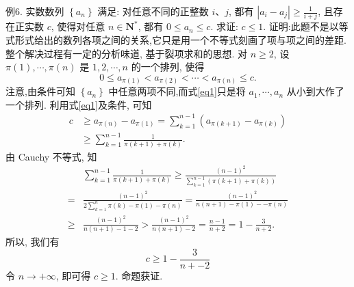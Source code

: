 例6. 实数数列 $\left\{a_n\right\}$ 满足: 对任意不同的正整数 $i 、 j$, 都有 $\left|a_i-a_j\right| \geqslant \frac{1}{i+j}$, 且存在正实数 $c$, 使得对任意 $n \in \mathbf{N}^*$, 都有 $0 \leqslant a_n \leqslant c$.
求证: $c \leqslant 1$.
证明:此题不是以等式形式给出的数列各项之间的关系,它只是用一个不等式刻画了项与项之间的差距.
整个解决过程有一定的分析味道, 基于裂项求和的思想.
对 $n \geqslant 2$, 设 $\pi(1), \cdots, \pi(n)$ 是 $1,2, \cdots, n$ 的一个排列, 使得
$$
0 \leqslant a_{\pi(1)}<a_{\pi(2)}<\cdots<a_{\pi(n)} \leqslant c . \label{eq1}
$$
注意,由条件可知 $\left\{a_n\right\}$ 中任意两项不同,而式\ref{eq1}只是将 $a_1, \cdots, a_n$ 从小到大作了一个排列.
利用式\ref{eq1}及条件, 可知
$$
\begin{aligned}
c & \geqslant a_{\pi(n)}-a_{\pi(1)}=\sum_{k=1}^{n-1}\left(a_{\pi(k+1)}-a_{\pi(k)}\right) \\
& \geqslant \sum_{k=1}^{n-1} \frac{1}{\pi(k+1)+\pi(k)} .
\end{aligned}
$$
由 Cauchy 不等式, 知
$$
\begin{aligned}
& \sum_{k=1}^{n-1} \frac{1}{\pi(k+1)+\pi(k)} \geqslant \frac{(n-1)^2}{\sum_{k=1}^{n-1}(\pi(k+1)+\pi(k))} \\
= & \frac{(n-1)^2}{2 \sum_{k=1}^n \pi(k)-\pi(1)-\pi(n)}=\frac{(n-1)^2}{n(n+1)-\pi(1)--\pi(n)} \\
\geqslant & \frac{(n-1)^2}{n(n+1)-1-2}>\frac{(n-1)^2}{n(n+1)-2}=\frac{n-1}{n+2}=1-\frac{3}{n+2} .
\end{aligned}
$$
所以, 我们有
$$
c \geqslant 1-\frac{3}{n+-2}
$$
令 $n \rightarrow+\infty$, 即可得 $c \geqslant 1$.
命题获证.



